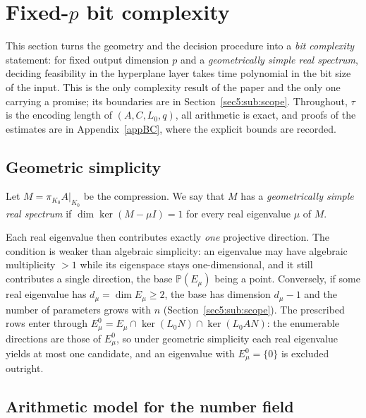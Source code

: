 \section{Fixed-\texorpdfstring{$p$}{p} bit complexity}\label{sec5}\label{sec:complexity}

This section turns the geometry and the decision procedure into a \emph{bit complexity} statement: for
fixed output dimension $p$ and a \emph{geometrically simple real spectrum}, deciding feasibility in the
hyperplane layer takes time polynomial in the bit size of the input. This is the only complexity result
of the paper and the only one carrying a promise; its boundaries are in
Section~\ref{sec5:sub:scope}. Throughout, $\tau$ is the encoding length of $(A,C,L_0,q)$, all
arithmetic is exact, and proofs of the estimates are in Appendix~\ref{appBC}, where the explicit
bounds are recorded.

\subsection{Geometric simplicity}\label{sec5:sub:gsimple}

\begin{defn}\label{sec5:def:gsimple}
Let $M=\pi_{K_0}A|_{K_0}$ be the compression. We say that $M$ has a \emph{geometrically simple real
spectrum} if $\dim\ker(M-\mu I)=1$ for every real eigenvalue $\mu$ of $M$.
\end{defn}

Each real eigenvalue then contributes exactly \emph{one} projective direction. The condition is weaker
than algebraic simplicity: an eigenvalue may have algebraic multiplicity $>1$ while its eigenspace
stays one-dimensional, and it still contributes a single direction, the base
$\mathbb{P}(E_\mu)$ being a point. Conversely, if some real eigenvalue has
$d_\mu=\dim E_\mu\ge2$, the base has dimension $d_\mu-1$ and the number of parameters grows with $n$
(Section~\ref{sec5:sub:scope}). The prescribed rows enter through
$E_\mu^0=E_\mu\cap\ker(L_0N)\cap\ker(L_0AN)$: the enumerable directions are those of $E_\mu^0$, so
under geometric simplicity each real eigenvalue yields at most one candidate, and an eigenvalue with
$E_\mu^0=\{0\}$ is excluded outright.

\subsection{Arithmetic model for the number field}\label{sec5:sub:model}

